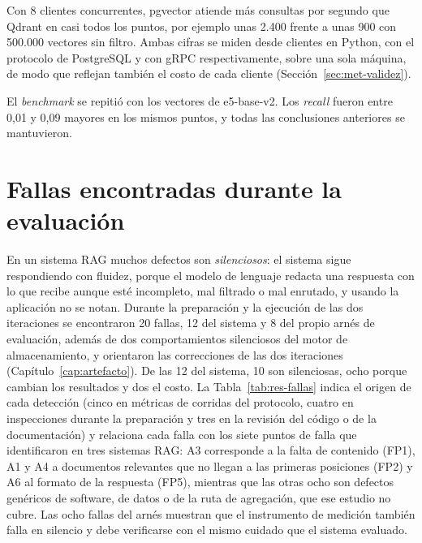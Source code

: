 Con 8 clientes concurrentes, pgvector atiende más consultas por segundo que Qdrant en casi todos los puntos, por ejemplo unas 2.400 frente a unas 900 con 500.000 vectores sin filtro. Ambas cifras se miden desde clientes en Python, con el protocolo de PostgreSQL y con gRPC respectivamente, sobre una sola máquina, de modo que reflejan también el costo de cada cliente (Sección~\ref{sec:met-validez}).

El \textit{benchmark} se repitió con los vectores de e5-base-v2. Los \textit{recall} fueron entre 0,01 y 0,09 mayores en los mismos puntos, y todas las conclusiones anteriores se mantuvieron.

\section{Fallas encontradas durante la evaluación}
\label{sec:res-fallas}

En un sistema RAG muchos defectos son \emph{silenciosos}: el sistema sigue respondiendo con fluidez, porque el modelo de lenguaje redacta una respuesta con lo que recibe aunque esté incompleto, mal filtrado o mal enrutado, y usando la aplicación no se notan. Durante la preparación y la ejecución de las dos iteraciones se encontraron 20 fallas, 12 del sistema y 8 del propio arnés de evaluación, además de dos comportamientos silenciosos del motor de almacenamiento, y orientaron las correcciones de las dos iteraciones (Capítulo~\ref{cap:artefacto}). De las 12 del sistema, 10 son silenciosas, ocho porque cambian los resultados y dos el costo. La Tabla~\ref{tab:res-fallas} indica el origen de cada detección (cinco en métricas de corridas del protocolo, cuatro en inspecciones durante la preparación y tres en la revisión del código o de la documentación) y relaciona cada falla con los siete puntos de falla que \citet{Barnett2024} identificaron en tres sistemas RAG: A3 corresponde a la falta de contenido (FP1), A1 y A4 a documentos relevantes que no llegan a las primeras posiciones (FP2) y A6 al formato de la respuesta (FP5), mientras que las otras ocho son defectos genéricos de software, de datos o de la ruta de agregación, que ese estudio no cubre. Las ocho fallas del arnés muestran que el instrumento de medición también falla en silencio y debe verificarse con el mismo cuidado que el sistema evaluado.

